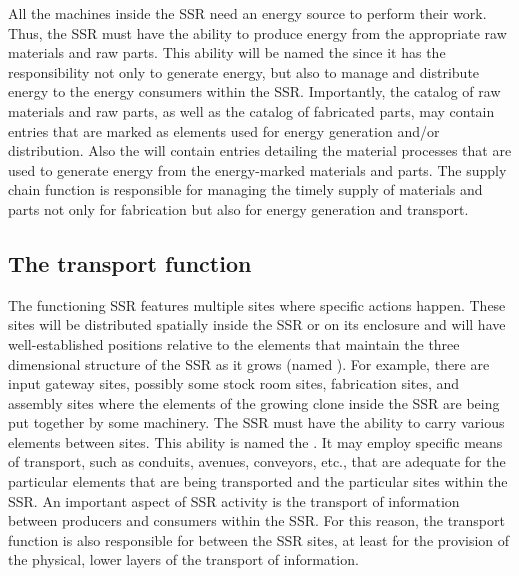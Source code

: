 All the machines inside the SSR need
an energy source to perform their work. Thus, the SSR must have the ability
to produce energy from the appropriate raw materials and raw parts.
This ability will be
named the  since it
has the responsibility not only to generate energy, but also to manage
and distribute energy to the energy consumers within the SSR. Importantly,
the catalog of raw materials and raw parts, as
well as the catalog of fabricated parts, may contain entries that are
marked as elements used for energy generation and/or distribution.
Also the  will contain entries detailing the
material processes that are used
to generate energy from the energy-marked materials and parts. The
supply chain function is responsible for managing the timely supply of
materials and parts not only for fabrication but also for energy
generation and transport.

\subsection[The transport function]{The transport function}

The functioning SSR features
multiple sites where specific actions happen. These
sites will be distributed spatially inside the SSR or on its enclosure
and will have well-established positions relative to the elements that
maintain the three dimensional structure of the SSR as it grows 
(named ). For example, there are input gateway sites,
possibly some stock room sites, fabrication sites,
and assembly sites where the elements of the growing clone
inside the SSR are being put together by some machinery. The SSR must
have the ability to carry various elements between sites. This
ability is named the . It may employ
specific means of transport, such as conduits, avenues, conveyors,
etc., that are adequate for the particular elements that are being transported and
the particular sites within the SSR.  An
important aspect of SSR activity is the transport of information
between producers and consumers within the SSR. For this reason, the
transport function is also responsible for  
between the SSR sites, at least for the provision of the
physical, lower layers of the transport of information.


